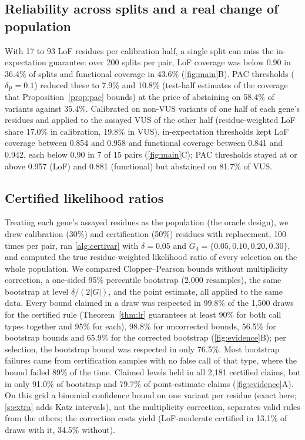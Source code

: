 \subsection{Reliability across splits and a real change of population}\label{sec:shift}
With 17 to 93 LoF residues per calibration half, a single split can miss the in-expectation guarantee: over 200 splits
per pair, LoF coverage was below 0.90 in 36.4\% of splits and functional coverage in 43.6\% (\cref{fig:main}B). PAC
thresholds ($\delta_{\mathrm P}=0.1$) reduced these to 7.9\% and 10.8\% (test-half estimates of the coverage that Proposition~\ref{prop:pac} bounds) at the price of abstaining on 58.4\% of variants against
35.4\%. Calibrated on non-VUS variants of one half of each gene's residues and applied to the assayed VUS of the other
half (residue-weighted LoF share 17.0\% in calibration, 19.8\% in VUS), in-expectation thresholds kept LoF coverage between 0.854 and 0.958
and functional coverage between 0.841 and 0.942, each below 0.90 in 7 of 15 pairs (\cref{fig:main}C); PAC thresholds
stayed at or above 0.957 (LoF) and 0.881 (functional) but abstained on 81.7\% of VUS.

\subsection{Certified likelihood ratios}\label{sec:evidence}
Treating each gene's assayed residues as the population (the oracle design), we drew calibration (30\%) and certification (50\%) residues
with replacement, 100 times per pair, ran \cref{alg:certivar} with $\delta=0.05$ and
$G_4=\{0.05,0.10,0.20,0.30\}$, and
computed the true residue-weighted likelihood ratio of every selection on the whole population. We compared
Clopper--Pearson bounds without multiplicity correction, a one-sided 95\% percentile bootstrap (2,000 resamples), the
same bootstrap at level $\delta/(2|G|)$, and the point estimate, all applied to the same data. Every bound claimed in a
draw was respected in 99.8\% of the 1,500 draws for the certified rule (Theorem~\ref{thm:lr} guarantees at least 90\% for both call types together and 95\% for each),
98.8\% for uncorrected bounds, 56.5\% for bootstrap bounds and 65.9\% for the corrected bootstrap
(\cref{fig:evidence}B); per selection, the bootstrap bound was respected in only 76.5\%. Most bootstrap failures came
from certification samples with no false call of that type, where the bound failed 89\% of the time. Claimed levels held
in all 2,181 certified claims, but in only 91.0\% of bootstrap and 79.7\% of point-estimate claims (\cref{fig:evidence}A).
On this grid a binomial confidence bound on one variant per residue (exact here; \cref{s:extra} adds Katz intervals),
not the multiplicity correction, separates valid rules from the others; the correction costs yield (LoF-moderate certified in 13.1\% of draws with it, 34.5\% without).

